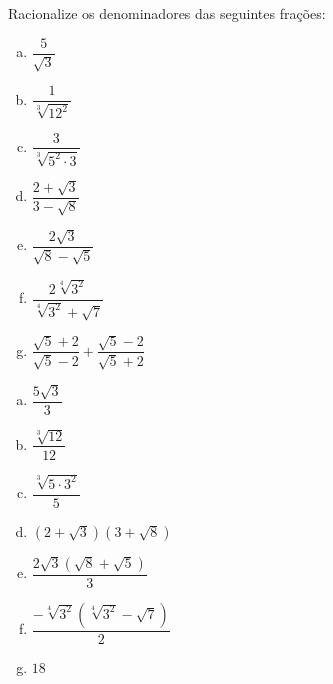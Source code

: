 \begin{exer}
Racionalize os denominadores das seguintes frações:
\begin{multicols}{2}
\begin{enumerate}[a)]
\item $\dfrac{5}{\sqrt{3}}$
\item $\dfrac{1}{\sqrt[3]{12^2}}$
\item $\dfrac{3}{\sqrt[3]{5^2 \cdot 3}}$
\item $\dfrac{2 + \sqrt{3}}{3 - \sqrt{8}}$
\item $\dfrac{2\sqrt{3}}{\sqrt{8} - \sqrt{5}}$
\item $\dfrac{2 \sqrt[4]{3^2}}{\sqrt[4]{3^2} + \sqrt{7}}$
\item $\dfrac{\sqrt{5} + 2}{\sqrt{5} - 2} + \dfrac{\sqrt{5} - 2}{\sqrt{5} + 2}$
\end{enumerate}
\end{multicols}
\end{exer}
\begin{resp}
 \begin{multicols}{3}
\begin{enumerate}[a)]
\item $\dfrac{5 \sqrt{3}}{3}$
\item $\dfrac{\sqrt[3]{12}}{12}$
\item $\dfrac{\sqrt[3]{5 \cdot 3^2}}{5}$
\item $(2 + \sqrt{3}) (3 + \sqrt{8})$
\item $\dfrac{2\sqrt{3} (\sqrt{8} + \sqrt{5})}{3}$
\item $\dfrac{- \sqrt[4]{3^2} (\sqrt[4]{3^2} - \sqrt{7})}{2}$
\item $18$
\end{enumerate}
\end{multicols}
\end{resp}

